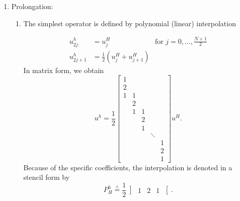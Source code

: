 \begin{enumerate}[label=\Alph{enumi})]
	\item Prolongation:
		\begin{enumerate}[label=\underline{\arabic{enumi}D}]
			\item The simplest operator is defined by polynomial (linear) interpolation
		
		\begin{align*}
			u_{2j}^{h} &= u_{j}^{H} \qquad\qquad\qquad \text{ for } j=0, \ldots, \frac{N+1}{2} \\
			u_{2j+1}^{h} &= \frac{1}{2}(u_{j}^{H}+u_{j+1}^{H})
		\end{align*}
		In matrix form, we obtain
		\[
		u^{h}= \frac{1}{2}\begin{bmatrix}
			1& & & & \\
			2& & & & \\
			1&1& & & \\
			 &2& & & \\
			 &1&1& & \\
			 & &2& & \\
			 & &1& & \\
			 & & &\ddots& \\
			 & & & &1 \\
			 & & & &2 \\
			 & & & &1
		\end{bmatrix}u^{H}
		.\] 
		Because of the specific coefficients, the interpolation is denoted in a stencil form by
		\[
			P_{H}^{h} \overset{\wedge}{=} \frac{1}{2}
			\left]
			\begin{matrix}
				1 & 2 & 1	
			\end{matrix}
			\right[
		.\] 


\end{enumerate}
\end{enumerate}

